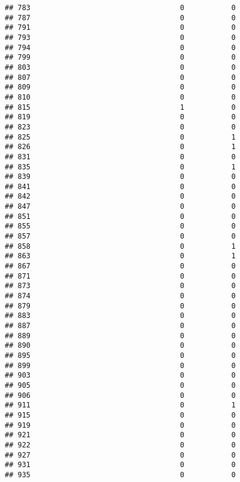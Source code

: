 \documentclass[
]{article}
\begin{document}
\begin{verbatim}
## 783                                   0           0
## 787                                   0           0
## 791                                   0           0
## 793                                   0           0
## 794                                   0           0
## 799                                   0           0
## 803                                   0           0
## 807                                   0           0
## 809                                   0           0
## 810                                   0           0
## 815                                   1           0
## 819                                   0           0
## 823                                   0           0
## 825                                   0           1
## 826                                   0           1
## 831                                   0           0
## 835                                   0           1
## 839                                   0           0
## 841                                   0           0
## 842                                   0           0
## 847                                   0           0
## 851                                   0           0
## 855                                   0           0
## 857                                   0           0
## 858                                   0           1
## 863                                   0           1
## 867                                   0           0
## 871                                   0           0
## 873                                   0           0
## 874                                   0           0
## 879                                   0           0
## 883                                   0           0
## 887                                   0           0
## 889                                   0           0
## 890                                   0           0
## 895                                   0           0
## 899                                   0           0
## 903                                   0           0
## 905                                   0           0
## 906                                   0           0
## 911                                   0           1
## 915                                   0           0
## 919                                   0           0
## 921                                   0           0
## 922                                   0           0
## 927                                   0           0
## 931                                   0           0
## 935                                   0           0

\end{verbatim}
\end{document}
